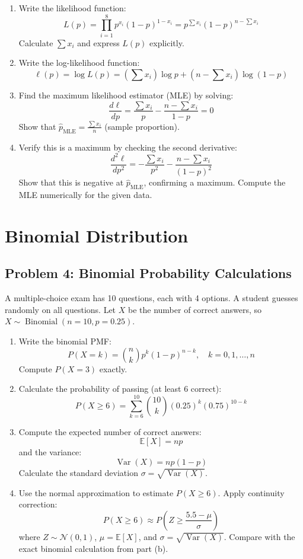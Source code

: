 \documentclass[12pt]{article}
\DeclareMathOperator{\Var}{Var}
\DeclareMathOperator{\Binom}{Binomial}
\begin{document}
\begin{enumerate}[label=(\alph*)]
\item Write the likelihood function:
\[
L(p) = \prod_{i=1}^{8} p^{x_i}(1-p)^{1-x_i} = p^{\sum x_i}(1-p)^{n - \sum x_i}
\]
Calculate \(\sum x_i\) and express \(L(p)\) explicitly.

\item Write the log-likelihood function:
\[
\ell(p) = \log L(p) = \left(\sum x_i\right) \log p + \left(n - \sum x_i\right) \log(1-p)
\]

\item Find the maximum likelihood estimator (MLE) by solving:
\[
\frac{d\ell}{dp} = \frac{\sum x_i}{p} - \frac{n - \sum x_i}{1-p} = 0
\]
Show that \(\hat{p}_{\text{MLE}} = \frac{\sum x_i}{n}\) (sample proportion).

\item Verify this is a maximum by checking the second derivative:
\[
\frac{d^2\ell}{dp^2} = -\frac{\sum x_i}{p^2} - \frac{n - \sum x_i}{(1-p)^2}
\]
Show that this is negative at \(\hat{p}_{\text{MLE}}\), confirming a maximum. Compute the MLE numerically for the given data.
\end{enumerate}


\section{Binomial Distribution}

\subsection*{Problem 4: Binomial Probability Calculations}

A multiple-choice exam has 10 questions, each with 4 options. A student guesses randomly on all questions. Let \(X\) be the number of correct answers, so \(X \sim \Binom(n=10, p=0.25)\).

\begin{enumerate}[label=(\alph*)]
\item Write the binomial PMF:
\[
P(X = k) = \binom{n}{k}p^k(1-p)^{n-k}, \quad k = 0, 1, \ldots, n
\]
Compute \(P(X = 3)\) exactly.

\item Calculate the probability of passing (at least 6 correct):
\[
P(X \geq 6) = \sum_{k=6}^{10} \binom{10}{k}(0.25)^k(0.75)^{10-k}
\]

\item Compute the expected number of correct answers:
\[
\mathbb{E}[X] = np
\]
and the variance:
\[
\Var(X) = np(1-p)
\]
Calculate the standard deviation \(\sigma = \sqrt{\Var(X)}\).

\item Use the normal approximation to estimate \(P(X \geq 6)\). Apply continuity correction:
\[
P(X \geq 6) \approx P\left(Z \geq \frac{5.5 - \mu}{\sigma}\right)
\]
where \(Z \sim \mathcal{N}(0,1)\), \(\mu = \mathbb{E}[X]\), and \(\sigma = \sqrt{\Var(X)}\). Compare with the exact binomial calculation from part (b).
\end{enumerate}
\end{document}
